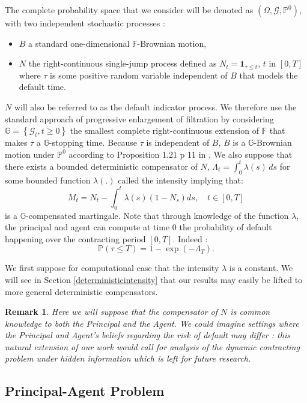 \documentclass[numbook, envcountsect, envcountsame, envcountreset, runningheads, smallextended]{article}
\newtheorem{Remark}{Remark}[part]
\begin{document}
The complete probability space that we consider will be denoted as $(\Omega, \mathcal{G}, \mathbb{P}^0)$, with two independent stochastic processes : 
\begin{itemize}
\item $B$ a standard one-dimensional $\mathbb{F}$-Brownian motion,
\item $N$ the right-continuous single-jump process defined as $N_t = \textbf{1}_{\tau \leq t}$, $t$ in $[0,T]$ where $\tau$ is some positive random variable independent of $B$ that models the default time. 
\end{itemize}
$N$ will also be referred to as the default indicator process. We therefore use the standard approach of progressive enlargement of filtration by considering $\mathbb{G} = \left\{ \mathcal{G}_t, t \geq 0\right\}$  the smallest complete right-continuous extension of  $\mathbb{F}$ that makes $\tau$ a $\mathbb G$-stopping time. Because $\tau$ is independent of $B$, $B$ is a $\mathbb{G}$-Brownian motion under $\mathbb{P}^0$ according to Proposition 1.21 p 11 in \cite{AksamitJeanblanc}. We also suppose that there exists a bounded deterministic compensator of $N$, $\Lambda_t = \int_0^t \lambda(s)\,ds $ for some bounded function $\lambda(.)$ called the intensity implying that:
$$ M_t = N_t - \int_0^t \lambda(s) (1-N_s) ds, \quad t \in [0,T]$$
is a $\mathbb{G}$-compensated martingale. Note that through knowledge of the function $\lambda,$ the principal and agent can compute at time 0 the probability of default happening over the contracting period $[0,T]$. Indeed : 
$$ \mathbb{P}(\tau \leq T) = 1 - \exp(-\Lambda_T).$$

We first suppose for computational ease that the intensity $\lambda$ is a constant. We will see in Section \ref{deterministicintensity} that our results may easily be lifted to more general deterministic compensators. 

\begin{Remark}
Here we will suppose that the compensator of $N$ is common knowledge to both the Principal and the Agent. We could imagine settings where the Principal and Agent's beliefs regarding the risk of default may differ : this natural extension of our work would call for analysis of the dynamic contracting problem under hidden information which is left for future research.
\end{Remark}



\subsection{Principal-Agent Problem}
\end{document}
